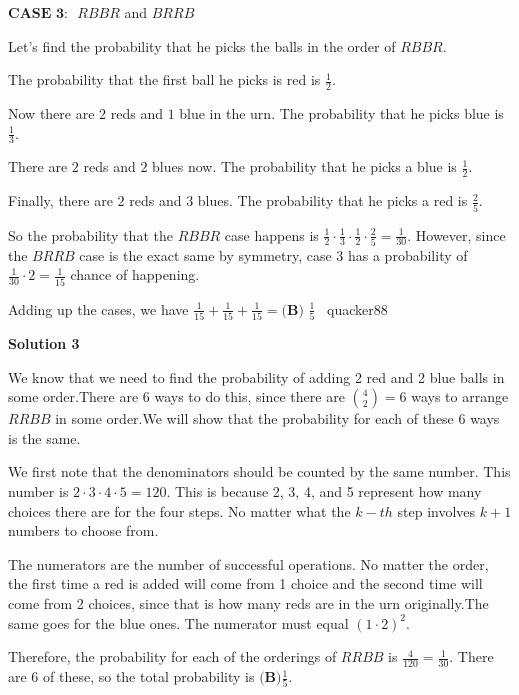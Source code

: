 \begin{enumerate}
 
$\textbf{CASE 3: }$ $RBBR$ and $BRRB$

 Let's find the probability that he picks the balls in the order of $RBBR$. 

 The probability that the first ball he picks is red is $\frac{1}{2}$. 

 Now there are $2$ reds and $1$ blue in the urn. The probability that he picks blue is $\frac{1}{3}$.

 There are $2$ reds and $2$ blues now. The probability that he picks a blue is $\frac{1}{2}$. 

 Finally, there are $2$ reds and $3$ blues. The probability that he picks a red is $\frac{2}{5}$.

 So the probability that the $RBBR$ case happens is $\frac{1}{2} \cdot \frac{1}{3} \cdot \frac{1}{2} \cdot \frac{2}{5} = \frac{1}{30}$. However, since the $BRRB$ case is the exact same by symmetry, case 3 has a probability of $\frac{1}{30} \cdot 2 = \frac{1}{15}$ chance of happening.

 Adding up the cases, we have $\frac{1}{15}+\frac{1}{15}+\frac{1}{15}=\boxed{\textbf{(B) }\frac15}$ ~quacker88

 



\textbf{Solution 3}

We know that we need to find the probability of adding 2 red and 2 blue balls in some order.There are 6 ways to do this, since there are $\binom{4}{2}=6$ ways to arrange $RRBB$ in some order.We will show that the probability for each of these 6 ways is the same.

 We first note that the denominators should be counted by the same number. This number is $2 \cdot 3 \cdot 4 \cdot 5=120$. This is because 2, 3, 4, and 5 represent how many choices there are for the four steps. No matter what the $k-th$ step involves $k+1$ numbers to choose from.

 The numerators are the number of successful operations. No matter the order, the first time a red is added will come from 1 choice and the second time will come from 2 choices, since that is how many reds are in the urn originally.The same goes for the blue ones. The numerator must equal $(1 \cdot 2)^2$.

 Therefore, the probability for each of the orderings of $RRBB$ is $\frac{4}{120}=\frac{1}{30}$. There are 6 of these, so the total probability is $\boxed{\textbf{(B)} \frac{1}{5}}$.

 




\end{enumerate}
